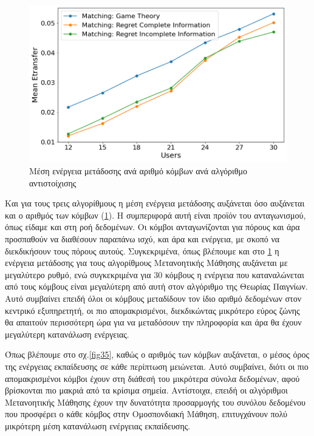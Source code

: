 \begin{figure}[ht]
    \centering
    \includegraphics[width=\textwidth]{figures/chapter4/Mean_Etransfer_vs_Users.png}
    \caption{Μέση ενέργεια μετάδοσης ανά αριθμό κόμβων ανά αλγόριθμο αντιστοίχισης}
    \label{fig34}
\end{figure}

Και για τους τρεις αλγορίθμους η μέση ενέργεια μετάδοσης αυξάνεται όσο αυξάνεται και ο αριθμός των κόμβων (\ref{fig34}). Η συμπεριφορά αυτή είναι προϊόν του ανταγωνισμού, όπως είδαμε και στη ροή δεδομένων. Οι κόμβοι ανταγωνίζονται για πόρους και άρα προσπαθούν να διαθέσουν παραπάνω ισχύ, και άρα και ενέργεια, με σκοπό να διεκδικήσουν τους πόρους αυτούς. Συγκεκριμένα, όπως βλέπουμε και στο \ref{fig34} η ενέργεια μετάδοσης για τους αλγορίθμους Μετανοητικής Μάθησης αυξάνεται με μεγαλύτερο ρυθμό, ενώ συγκεκριμένα για 30 κόμβους η ενέργεια που καταναλώνεται από τους κόμβους είναι μεγαλύτερη από αυτή στον αλγόριθμο της Θεωρίας Παιγνίων. Αυτό συμβαίνει επειδή όλοι οι κόμβους μεταδίδουν τον ίδιο αριθμό δεδομένων στον κεντρικό εξυπηρετητή, οι πιο απομακρισμένοι, διεκδικώντας μικρότερο εύρος ζώνης θα απαιτούν περισσότερη ώρα για να μεταδόσουν την πληροφορία και άρα θα έχουν μεγαλύτερη κατανάλωση ενέργειας.

Όπως βλέπουμε στο σχ.\ref{fig35}, καθώς ο αριθμός των κόμβων αυξάνεται, ο μέσος όρος της ενέργειας εκπαίδευσης σε κάθε περίπτωση μειώνεται. Αυτό συμβαίνει, διότι οι πιο απομακρισμένοι κόμβοι έχουν στη διάθεσή του μικρότερα σύνολα δεδομένων, αφού βρίσκονται πιο μακριά από τα κρίσιμα σημεία. Αντίστοιχα, επειδή οι αλγόριθμοι Μετανοητικής Μάθησης έχουν την δυνατότητα προσαρμογής του συνόλου δεδομένου που προσφέρει ο κάθε κόμβος στην Ομοσπονδιακή Μάθηση, επιτυγχάνουν πολύ μικρότερη μέση κατανάλωση ενέργειας εκπαίδευσης. 

